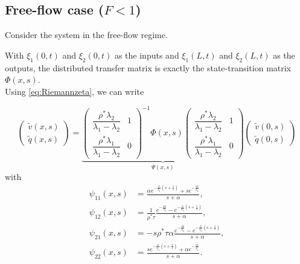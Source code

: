 \documentclass[preprint]{elsarticle}
\begin{document}
\subsection{Free-flow case ($F<1$)}
Consider the system in the free-flow regime. 

With $\xi_1 (0,t)$ and $\xi_2 (0,t)$ as the inputs and $\xi_1(L,t)$ and $\xi_2(L,t)$ as the outputs, the distributed transfer matrix is exactly the state-transition matrix $\Phi(x,s)$.\\

Using \eqref{eq:Riemannzeta}, we can write

\begin{equation} \label{vqfreeflow}
\begin{pmatrix}
\widetilde{v}(x,s) \\ \widetilde{q}(x,s)
\end{pmatrix} = \underbrace{ \begin{pmatrix}
\dfrac{\rho^*\lambda_2}{\lambda_1-\lambda_2} & 1\\
\dfrac{\rho^*\lambda_1}{\lambda_1-\lambda_2} & 0
\end{pmatrix}^{-1} \Phi(x,s) 
\begin{pmatrix}
\dfrac{\rho^*\lambda_2}{\lambda_1-\lambda_2} & 1\\
\dfrac{\rho^*\lambda_1}{\lambda_1-\lambda_2} & 0
\end{pmatrix} }_\text{$\Psi (x,s)$} \begin{pmatrix}
\widetilde{v}(0,s) \\ \widetilde{q}(0,s)
\end{pmatrix}
\end{equation}
with
\begin{subequations}
\begin{align}
\psi_{11}(x,s) &= 
\frac{
	\alpha e^{-\frac{x}{\lambda_{1}}\left(s+\frac{1}{\tau}\right)}
		+ s e^{-\frac{sx}{\lambda_{2}}}
}{
	s + \alpha
}, \\
\psi_{12}(x,s) &=
\frac{1}{\rho^* \tau}
\frac{
	e^{-\frac{sx}{\lambda_{2}}}
	-
	e^{-\frac{x}{\lambda_{1}}\left(s+\frac{1}		{\tau}\right)}
}{
	s + \alpha
}, \\
\psi_{21}(x,s) &=
- s \rho^{*} \tau \alpha
\frac{
	e^{-\frac{sx}{\lambda_{2}}}
	-
	e^{-\frac{x}{\lambda_{1}}\left(s+\frac{1}		{\tau}\right)}
}{
	s + \alpha
}, \\
\psi_{22}(x,s) &=
\frac{
	s e^{-\frac{x}{\lambda_{1}}\left(s+\frac{1}{\tau}\right)}
		+ \alpha e^{-\frac{sx}{\lambda_{2}}}
}{
	s + \alpha
}.
\end{align}
\end{subequations}
\end{document}

